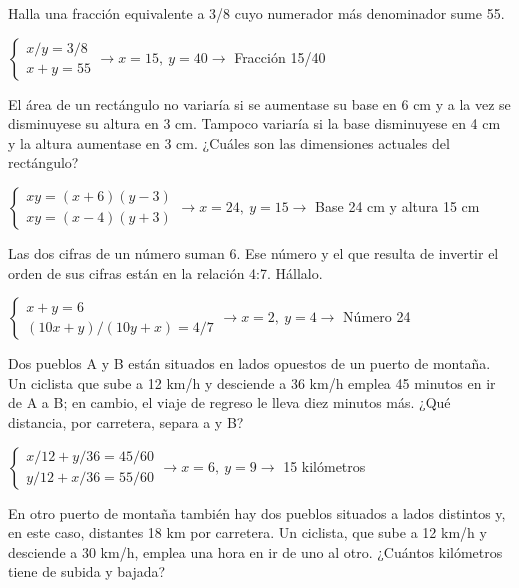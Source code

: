 \documentclass[spanish, 12pt]{exam}
\begin{document}
\begin{questions}
\question Halla una fracción equivalente a 3/8 cuyo numerador más denominador sume 55.

\begin{solution} $\left\{\begin{matrix}x/y=3/8 \\ x+y=55\end{matrix}\right. \to  x = 15, \  y = 40 \to $ Fracción 15/40 \end{solution}

\question El área de un rectángulo no variaría si se aumentase su base en 6 cm y a la vez se disminuyese su altura en 3 cm. Tampoco variaría si la base disminuyese en 4 cm y la altura aumentase en 3 cm. ¿Cuáles son las dimensiones actuales del rectángulo?
\begin{solution} $\left\{\begin{matrix}xy=(x+6)(y-3) \\ xy=(x-4)(y+3)\end{matrix}\right. \to  x = 24, \  y = 15 \to $ Base 24 cm y altura 15 cm \end{solution}

\question Las dos cifras de un número suman 6. Ese número y el que resulta de invertir el orden de sus cifras están en la relación 4:7. Hállalo.
\begin{solution}  $\left\{\begin{matrix}x+y=6 \\ (10x+y)/(10y+x)=4/7\end{matrix}\right. \to  x = 2, \  y = 4 \to $ Número 24 \end{solution}

\question Dos pueblos A y B están situados en lados opuestos de un puerto de montaña. Un ciclista que sube a 12 km/h y desciende a 36 km/h emplea 45 minutos en ir de A a B; en cambio, el viaje de regreso le lleva diez minutos más. ¿Qué distancia, por carretera, separa a y B?
\begin{solution} $\left\{\begin{matrix}x/12+y/36=45/60 \\ y/12+x/36=55/60\end{matrix}\right. \to  x = 6, \  y = 9 \to $ 15 kilómetros \end{solution}

\question En otro puerto de montaña también hay dos pueblos situados a lados distintos y, en este caso, distantes 18 km por carretera. Un ciclista, que sube a 12 km/h y desciende a 30 km/h, emplea una hora en ir de uno al otro. ¿Cuántos kilómetros tiene de subida y bajada?


\end{questions}
\end{document}
